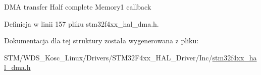 D\+MA transfer Half complete Memory1 callback 

Definicja w linii 157 pliku stm32f4xx\+\_\+hal\+\_\+dma.\+h.



Dokumentacja dla tej struktury została wygenerowana z pliku\+:\begin{DoxyCompactItemize}
\item 
S\+T\+M/\+W\+D\+S\+\_\+\+Kosc\+\_\+\+Linux/\+Drivers/\+S\+T\+M32\+F4xx\+\_\+\+H\+A\+L\+\_\+\+Driver/\+Inc/\hyperlink{stm32f4xx__hal__dma_8h}{stm32f4xx\+\_\+hal\+\_\+dma.\+h}\end{DoxyCompactItemize}
